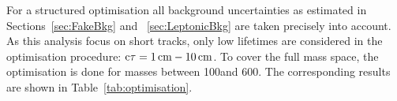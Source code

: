 For a structured optimisation all background uncertainties as estimated in Sections~\ref{sec:FakeBkg} and ~\ref{sec:LeptonicBkg} are taken precisely into account. 
As this analysis focus on short tracks, only low lifetimes are considered in the optimisation procedure: $\text{c}\tau=1\,\text{cm}-10\,\text{cm}$.
To cover the full mass space, the optimisation is done for masses between 100\gev and 600\gev.
The corresponding results are shown in Table~\ref{tab:optimisation}.
\renewcommand{\arraystretch}{1.3}
\begin{table}[!h]
\centering
\caption{Optimal \pt and \ias selection cuts and the corresponding minimum cross section $\sigma_{\text{min}}$ that can be discovered with 5$\sigma$ significance for different signal models.
         For some signal samples a optimisation result is not availabale due to the limited size of these samples.}
\label{tab:optimisation}
\end{table}
